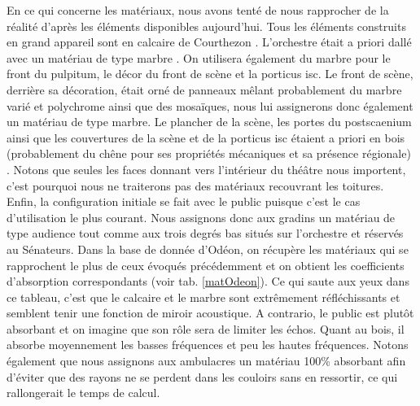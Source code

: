 En ce qui concerne les matériaux, nous avons tenté de nous rapprocher de la réalité d'après les éléments disponibles aujourd'hui. Tous les éléments construits en grand appareil sont en calcaire de Courthezon \cite[p.43]{orangeTxt}. L'orchestre était a priori dallé avec un matériau de type marbre \cite[p.337]{orangeTxt}. On utilisera également du marbre pour le front du \gls{pulpitum}, le décor du front de scène et la \gls{porticus isc}. Le front de scène, derrière sa décoration, était orné de panneaux mêlant probablement du marbre varié et polychrome ainsi que des mosaïques, nous lui assignerons donc également un matériau de type marbre. Le plancher de la scène, les portes du \gls{postscaenium} ainsi que les couvertures de la scène et de la \gls{porticus isc} étaient a priori en bois (probablement du chêne pour ses propriétés mécaniques et sa présence régionale) \cite[p.34 et 43]{formige}. Notons que seules les faces donnant vers l'intérieur du théâtre nous importent, c'est pourquoi nous ne traiterons pas des matériaux recouvrant les toitures. Enfin, la configuration initiale se fait avec le public puisque c'est le cas d'utilisation le plus courant. Nous assignons donc aux gradins un matériau de type audience tout comme aux trois degrés bas situés sur l'orchestre et réservés au Sénateurs. Dans la base de donnée d'Odéon\cite[materials]{odeon}, on récupère les matériaux qui se rapprochent le plus de ceux évoqués précédemment et on obtient les coefficients d'absorption correspondants (voir tab. \ref{matOdeon}). Ce qui saute aux yeux dans ce tableau, c'est que le calcaire et le marbre sont extrêmement réfléchissants et semblent tenir une fonction de miroir acoustique. A contrario, le public est plutôt absorbant et on imagine que son rôle sera de limiter les échos. Quant au bois, il absorbe moyennement les basses fréquences et peu les hautes fréquences. Notons également que nous assignons aux ambulacres un matériau 100\% absorbant afin d'éviter que des rayons ne se perdent dans les couloirs sans en ressortir, ce qui rallongerait le temps de calcul.
%
